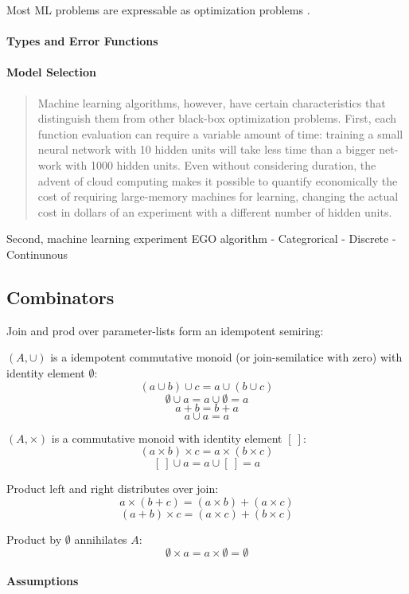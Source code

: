 \documentclass[english]{article}
\begin{document}
Most \acf{ML} problems are expressable as optimization problems \cite{bennett_interplay_2006}.

\paragraph{Types and Error Functions}


\paragraph{Model Selection}



\begin{quote}
Machine learning algorithms, however, have certain characteristics that distinguish them from other black-box optimization problems.  First, each function evaluation can require a variable amount of time:  training a small neural network with 10 hidden units will take less time than a bigger net-work with 1000 hidden units.  Even without considering duration, the advent of cloud computing makes it possible to quantify economically the cost of requiring large-memory machines for learning, changing the actual cost in dollars of an experiment with a different number of hidden units.
\end{quote}
Second, machine learning experiment EGO algorithm
 - Categrorical
 - Discrete
 - Continunous


\subsection{Combinators}
Join and prod over parameter-lists form an idempotent semiring:

$(A, \cup)$ is a idempotent commutative monoid (or join-semilatice with zero) with identity element $\emptyset$:
$$(a \cup b) \cup c = a \cup (b \cup c)$$
$$\emptyset \cup a = a \cup \emptyset = a$$
$$a + b = b + a$$
$$a \cup a = a$$

$(A, \times)$ is a commutative monoid with identity element $[\ ]$:
$$(a \times b) \times c = a \times (b \times c)$$
$$[\ ] \cup a = a \cup [\ ] = a$$

Product left and right distributes over join:
$$a\times(b + c) = (a\times b) + (a\times c)$$
$$(a + b)\times c = (a\times c) + (b\times c)$$

Product by $\emptyset$ annihilates $A$:
$$\emptyset \times a = a \times \emptyset = \emptyset$$

\paragraph{Assumptions}
\end{document}
